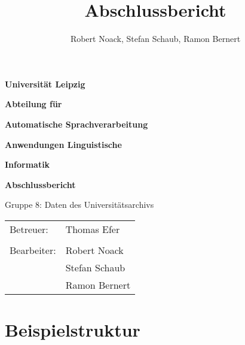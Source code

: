 \documentclass[12pt,a4paper]{article}
\title{Abschlussbericht}
\author{Robert Noack, Stefan Schaub, Ramon Bernert}
\begin{document}
\thispagestyle{empty}


\begin{LARGE}
 \centering
 \vspace*{0.35cm} \textbf{Universität Leipzig}

 \vspace*{0.4cm}
 \textbf{Abteilung für}
 
 \textbf{Automatische Sprachverarbeitung}

 \vspace*{2cm}
 \textbf{Anwendungen Linguistische}

 \textbf{Informatik}

 \vspace*{0.8cm}
 \textbf{Abschlussbericht}

 \vspace*{1cm}
 \hspace*{0.8cm} Gruppe 8: Daten des Universitätsarchivs
\end{LARGE}

\vspace*{\fill}
\begin{large}
 \begin{tabular}{p{7cm} l}
  Betreuer:		& Thomas Efer	\\
\\
  Bearbeiter: 	& Robert Noack 	\\
				& Stefan Schaub \\
				& Ramon Bernert \\
 \end{tabular}
\end{large}


\newpage
\thispagestyle{empty}

\tableofcontents
{}


\newpage
\setcounter{page}{1}







\newpage
\section{Beispielstruktur}
 \label{sec:Beispielstruktur}
 
\end{document}
